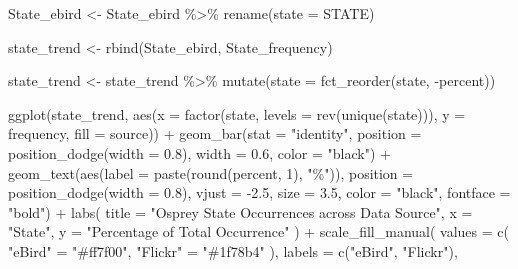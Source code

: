 \documentclass[
  letterpaper,
  DIV=11,
  numbers=noendperiod]{scrartcl}
\newenvironment{Shaded}{\begin{snugshade}}{\end{snugshade}}
\newcommand{\AttributeTok}[1]{\textcolor[rgb]{0.40,0.45,0.13}{#1}}
\newcommand{\DecValTok}[1]{\textcolor[rgb]{0.68,0.00,0.00}{#1}}
\newcommand{\FloatTok}[1]{\textcolor[rgb]{0.68,0.00,0.00}{#1}}
\newcommand{\FunctionTok}[1]{\textcolor[rgb]{0.28,0.35,0.67}{#1}}
\newcommand{\NormalTok}[1]{\textcolor[rgb]{0.00,0.23,0.31}{#1}}
\newcommand{\OtherTok}[1]{\textcolor[rgb]{0.00,0.23,0.31}{#1}}
\newcommand{\SpecialCharTok}[1]{\textcolor[rgb]{0.37,0.37,0.37}{#1}}
\newcommand{\StringTok}[1]{\textcolor[rgb]{0.13,0.47,0.30}{#1}}
\begin{document}
\begin{Shaded}
\begin{Highlighting}[]
\NormalTok{State\_ebird }\OtherTok{\textless{}{-}}\NormalTok{ State\_ebird }\SpecialCharTok{\%\textgreater{}\%}
  \FunctionTok{rename}\NormalTok{(}\AttributeTok{state =}\NormalTok{ STATE) }

\NormalTok{state\_trend }\OtherTok{\textless{}{-}} \FunctionTok{rbind}\NormalTok{(State\_ebird, State\_frequency)}

\NormalTok{state\_trend }\OtherTok{\textless{}{-}}\NormalTok{ state\_trend }\SpecialCharTok{\%\textgreater{}\%}
  \FunctionTok{mutate}\NormalTok{(}\AttributeTok{state =} \FunctionTok{fct\_reorder}\NormalTok{(state, }\SpecialCharTok{{-}}\NormalTok{percent))}

\FunctionTok{ggplot}\NormalTok{(state\_trend, }\FunctionTok{aes}\NormalTok{(}\AttributeTok{x =} \FunctionTok{factor}\NormalTok{(state, }\AttributeTok{levels =} \FunctionTok{rev}\NormalTok{(}\FunctionTok{unique}\NormalTok{(state))), }\AttributeTok{y =}\NormalTok{ frequency, }\AttributeTok{fill =}\NormalTok{ source)) }\SpecialCharTok{+}
  \FunctionTok{geom\_bar}\NormalTok{(}\AttributeTok{stat =} \StringTok{"identity"}\NormalTok{, }\AttributeTok{position =} \FunctionTok{position\_dodge}\NormalTok{(}\AttributeTok{width =} \FloatTok{0.8}\NormalTok{), }\AttributeTok{width =} \FloatTok{0.6}\NormalTok{, }\AttributeTok{color =} \StringTok{"black"}\NormalTok{) }\SpecialCharTok{+} 
  \FunctionTok{geom\_text}\NormalTok{(}\FunctionTok{aes}\NormalTok{(}\AttributeTok{label =} \FunctionTok{paste}\NormalTok{(}\FunctionTok{round}\NormalTok{(percent, }\DecValTok{1}\NormalTok{), }\StringTok{"\%"}\NormalTok{)), }
            \AttributeTok{position =} \FunctionTok{position\_dodge}\NormalTok{(}\AttributeTok{width =} \FloatTok{0.8}\NormalTok{), }
            \AttributeTok{vjust =} \SpecialCharTok{{-}}\FloatTok{2.5}\NormalTok{, }\AttributeTok{size =} \FloatTok{3.5}\NormalTok{, }\AttributeTok{color =} \StringTok{"black"}\NormalTok{, }\AttributeTok{fontface =} \StringTok{"bold"}\NormalTok{) }\SpecialCharTok{+}
  \FunctionTok{labs}\NormalTok{(}
    \AttributeTok{title =} \StringTok{"Osprey State Occurrences across Data Source"}\NormalTok{,}
    \AttributeTok{x =} \StringTok{"State"}\NormalTok{,}
    \AttributeTok{y =} \StringTok{"Percentage of Total Occurrence"}
\NormalTok{  ) }\SpecialCharTok{+}
  \FunctionTok{scale\_fill\_manual}\NormalTok{(}
    \AttributeTok{values =} \FunctionTok{c}\NormalTok{( }\StringTok{"eBird"} \OtherTok{=} \StringTok{"\#ff7f00"}\NormalTok{, }\StringTok{"Flickr"} \OtherTok{=} \StringTok{"\#1f78b4"}\NormalTok{ ), }
    \AttributeTok{labels =} \FunctionTok{c}\NormalTok{(}\StringTok{"eBird"}\NormalTok{, }\StringTok{"Flickr"}\NormalTok{), }

\end{Highlighting}
\end{Shaded}
\end{document}
